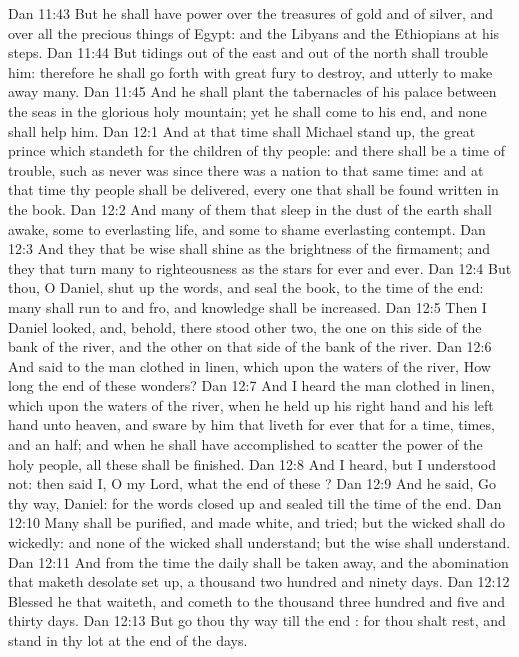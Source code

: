 \vs Dan 11:43 But he shall have power over the treasures of gold and of silver, and over all the precious things of Egypt: and the Libyans and the Ethiopians  at his steps.
\vs Dan 11:44 But tidings out of the east and out of the north shall trouble him: therefore he shall go forth with great fury to destroy, and utterly to make away many.
\vs Dan 11:45 And he shall plant the tabernacles of his palace between the seas in the glorious holy mountain; yet he shall come to his end, and none shall help him.
\vs Dan 12:1 And at that time shall Michael stand up, the great prince which standeth for the children of thy people: and there shall be a time of trouble, such as never was since there was a nation  to that same time: and at that time thy people shall be delivered, every one that shall be found written in the book.
\vs Dan 12:2 And many of them that sleep in the dust of the earth shall awake, some to everlasting life, and some to shame  everlasting contempt.
\vs Dan 12:3 And they that be wise shall shine as the brightness of the firmament; and they that turn many to righteousness as the stars for ever and ever.
\vs Dan 12:4 But thou, O Daniel, shut up the words, and seal the book,  to the time of the end: many shall run to and fro, and knowledge shall be increased.
\vs Dan 12:5 Then I Daniel looked, and, behold, there stood other two, the one on this side of the bank of the river, and the other on that side of the bank of the river.
\vs Dan 12:6 And  said to the man clothed in linen, which  upon the waters of the river, How long  the end of these wonders?
\vs Dan 12:7 And I heard the man clothed in linen, which  upon the waters of the river, when he held up his right hand and his left hand unto heaven, and sware by him that liveth for ever that  for a time, times, and an half; and when he shall have accomplished to scatter the power of the holy people, all these  shall be finished.
\vs Dan 12:8 And I heard, but I understood not: then said I, O my Lord, what  the end of these ?
\vs Dan 12:9 And he said, Go thy way, Daniel: for the words  closed up and sealed till the time of the end.
\vs Dan 12:10 Many shall be purified, and made white, and tried; but the wicked shall do wickedly: and none of the wicked shall understand; but the wise shall understand.
\vs Dan 12:11 And from the time  the daily  shall be taken away, and the abomination that maketh desolate set up,  a thousand two hundred and ninety days.
\vs Dan 12:12 Blessed  he that waiteth, and cometh to the thousand three hundred and five and thirty days.
\vs Dan 12:13 But go thou thy way till the end : for thou shalt rest, and stand in thy lot at the end of the days.
